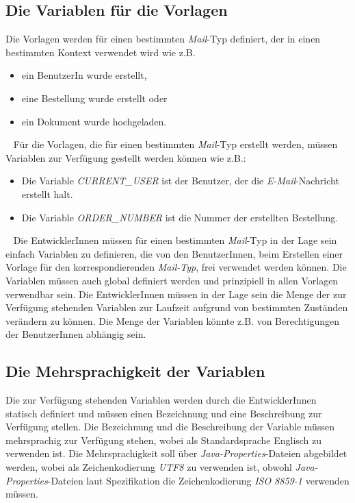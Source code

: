 \subsection{Die Variablen für die Vorlagen}
Die Vorlagen werden für einen bestimmten \emph{Mail}-Typ definiert, der in einen bestimmten Kontext verwendet wird wie z.B.
\begin{itemize}
	\item ein BenutzerIn wurde erstellt,
	\item eine Bestellung wurde erstellt oder
	\item ein Dokument wurde hochgeladen.
\end{itemize}
\ \newline
Für die Vorlagen, die für einen bestimmten \emph{Mail}-Typ erstellt werden, müssen Variablen zur Verfügung gestellt werden können wie z.B.:
\begin{itemize}
	\item Die Variable \emph{CURRENT\_USER}
	\newline
	ist der Benutzer, der die \emph{E-Mail}-Nachricht erstellt halt.
	\item Die Variable \emph{ORDER\_NUMBER}
	\newline
	ist die Nummer der erstellten Bestellung.
\end{itemize}
\ \newline
Die EntwicklerInnen müssen für einen bestimmten \emph{Mail}-Typ in der Lage sein einfach Variablen zu definieren, die von den BenutzerInnen, beim Erstellen einer Vorlage für den korrespondierenden \emph{Mail-Typ}, frei verwendet werden können. Die Variablen müssen auch global definiert werden und prinzipiell in allen Vorlagen verwendbar sein. Die EntwicklerInnen müssen in der Lage sein die Menge der zur Verfügung stehenden Variablen zur Laufzeit aufgrund von bestimmten Zuständen verändern zu können. Die Menge der Variablen könnte z.B. von Berechtigungen der BenutzerInnen abhängig sein.

\subsection{Die Mehrsprachigkeit der Variablen}
Die zur Verfügung stehenden Variablen werden durch die EntwicklerInnen statisch definiert und müssen einen Bezeichnung und eine Beschreibung zur Verfügung stellen. Die Bezeichnung und die Beschreibung der Variable müssen mehrsprachig zur Verfügung stehen, wobei als Standardsprache Englisch zu verwenden ist. Die Mehrsprachigkeit soll über \emph{Java-Properties}-Dateien abgebildet werden, wobei als Zeichenkodierung \emph{UTF8} zu verwenden ist, obwohl \emph{Java- Properties}-Dateien laut Spezifikation die Zeichenkodierung \emph{ISO 8859-1} verwenden müssen.

